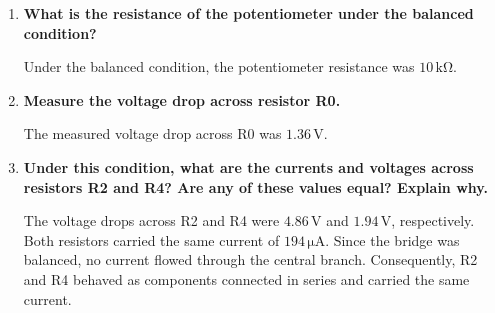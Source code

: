 \begin{enumerate}
    \item \textbf{What is the resistance of the potentiometer under the balanced condition?}      
    \par \vspace{0.15cm}
    Under the balanced condition, the potentiometer resistance was $10\,\mathrm{k\Omega}$.
    
    \item \textbf{Measure the voltage drop across resistor R0.}     
    \par \vspace{0.15cm}
    The measured voltage drop across R0 was $1.36\,\mathrm{V}$.
    
    \item \textbf{Under this condition, what are the currents and voltages across resistors R2 and R4? Are any of these values equal? Explain why.}      
    \par \vspace{0.15cm}
    The voltage drops across R2 and R4 were $4.86\,\mathrm{V}$ and $1.94\,\mathrm{V}$, respectively. Both resistors carried the same current of $194\,\mathrm{\mu A}$. Since the bridge was balanced, no current flowed through the central branch. Consequently, R2 and R4 behaved as components connected
    in series and carried the same current.
\end{enumerate}

